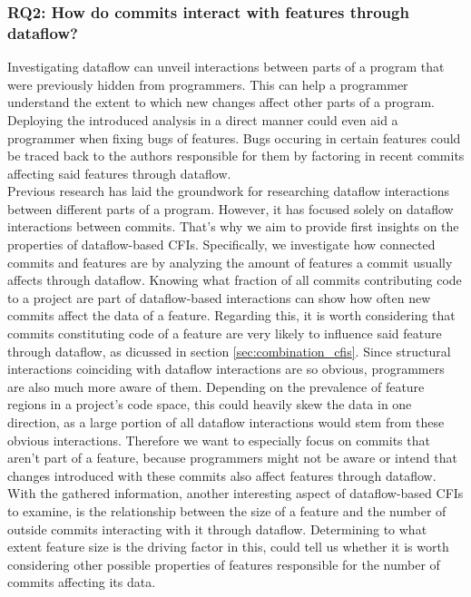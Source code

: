 \subsubsection*{\textbf{RQ2: How do commits interact with features through dataflow?}}

Investigating dataflow can unveil interactions between parts of a program that were previously hidden from programmers.
This can help a programmer understand the extent to which new changes affect other parts of a program.
Deploying the introduced analysis in a direct manner could even aid a programmer when fixing bugs of features.
Bugs occuring in certain features could be traced back to the authors responsible for them by factoring in recent commits affecting said features through dataflow. \\
Previous research has laid the groundwork for researching dataflow interactions between different parts of a program.
However, it has focused solely on dataflow interactions between commits.
That's why we aim to provide first insights on the properties of dataflow-based CFIs.
Specifically, we investigate how connected commits and features are by analyzing the amount of features a commit usually affects through dataflow.
Knowing what fraction of all commits contributing code to a project are part of dataflow-based interactions can show how often new commits affect the data of a feature. 
Regarding this, it is worth considering that commits constituting code of a feature are very likely to influence said feature through dataflow, as dicussed in section \ref{sec:combination_cfis}.
Since structural interactions coinciding with dataflow interactions are so obvious, programmers are also much more aware of them. 
Depending on the prevalence of feature regions in a project's code space, this could heavily skew the data in one direction, as a large portion of all dataflow interactions would stem from these obvious interactions. 
Therefore we want to especially focus on commits that aren't part of a feature, because programmers might not be aware or intend that changes introduced with these commits also affect features through dataflow. 
With the gathered information, another interesting aspect of dataflow-based CFIs to examine, is the relationship between the size of a feature and the number of outside commits interacting with it through dataflow.
Determining to what extent feature size is the driving factor in this, could tell us whether it is worth considering other possible properties of features responsible for the number of commits affecting its data.

